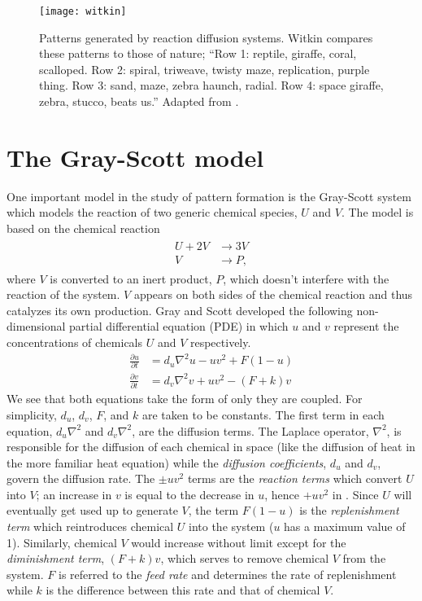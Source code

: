 \begin{figure}[h]
	\centering
	\texttt{[image: witkin]}
         \caption{Patterns generated by reaction diffusion systems. Witkin compares these patterns to those of nature; ``Row 1: reptile, giraffe, coral, scalloped. Row 2: spiral, triweave, twisty maze, replication, purple thing. Row 3: sand, maze, zebra haunch, radial. Row 4: space giraffe, zebra, stucco, beats us.'' Adapted from \protect{}.} \label{fig:witkin}
\end{figure}
	
\section{The Gray-Scott model} \label{sect:gsmodel}
	One important model in the study of pattern formation is the Gray-Scott system which models the reaction of two generic chemical species, $U$ and $V$. The model is based on the chemical reaction
	\begin{align}
	\begin{split}
		U + 2V &\rightarrow 3V \\
		V &\rightarrow P,
		\label{eq:gs-chem}
	\end{split}
	\end{align}
where $V$ is converted to an inert product, $P$, which doesn't interfere with the reaction of the system. $V$ appears on both sides of the chemical reaction and thus catalyzes its own production. Gray and Scott developed the following non-dimensional partial differential equation (PDE) in which $u$ and $v$ represent the concentrations of chemicals $U$ and $V$ respectively.
	\begin{align}
		\frac{\partial u}{\partial t} & = d_u \nabla^2 u - uv^2 + F(1-u) \label{eq:gsu} \\
		\frac{\partial v}{\partial t} & = d_v \nabla^2 v  + uv^2 - (F +k)v \label{eq:gsv}
	\end{align}
We see that both equations take the form of  only they are coupled. For simplicity, $d_u$, $d_v$, $F$, and $k$ are taken to be constants. The first term in each equation, $d_u \nabla^2$ and $d_v \nabla^2$, are the diffusion terms. The Laplace operator, $\nabla^2$, is responsible for the diffusion of each chemical in space (like the diffusion of heat in the more familiar heat equation) while the \textit{diffusion coefficients}, $d_u$ and $d_v$, govern the diffusion rate. The $\pm uv^2$ terms are the  \textit{reaction terms} which convert $U$ into $V$; an increase in $v$ is equal to the decrease in $u$, hence $+uv^2$ in . Since $U$ will eventually get used up to generate $V$, the term $F(1-u)$ is the \textit{replenishment term} which reintroduces chemical $U$ into the system ($u$ has a maximum value of 1). Similarly, chemical $V$ would increase without limit except for the \textit{diminishment term}, $(F+k)v$, which serves to remove chemical $V$ from the system. $F$ is referred to the \textit{feed rate} and determines the rate of replenishment while $k$ is the difference between this rate and that of chemical $V$.


